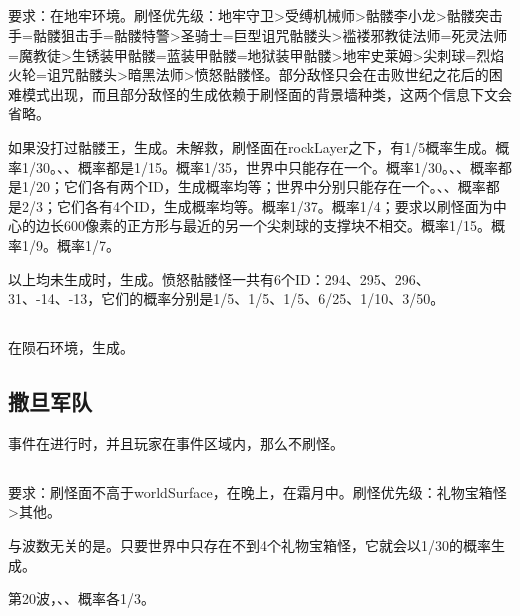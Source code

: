 \subsection{}
要求：在地牢环境。刷怪优先级：地牢守卫>受缚机械师>骷髅李小龙>骷髅突击手=骷髅狙击手=骷髅特警>圣骑士=巨型诅咒骷髅头>褴褛邪教徒法师=死灵法师=魔教徒>生锈装甲骷髅=蓝装甲骷髅=地狱装甲骷髅>地牢史莱姆>尖刺球=烈焰火轮=诅咒骷髅头>暗黑法师>愤怒骷髅怪。部分敌怪只会在击败世纪之花后的困难模式出现，而且部分敌怪的生成依赖于刷怪面的背景墙种类，这两个信息下文会省略。

如果没打过骷髅王，生成。未解救，刷怪面在rockLayer之下，有1/5概率生成。概率1/30。、、概率都是1/15。概率1/35，世界中只能存在一个。概率1/30。、、概率都是1/20；它们各有两个ID，生成概率均等；世界中分别只能存在一个。、、概率都是2/3；它们各有4个ID，生成概率均等。概率1/37。概率1/4；要求以刷怪面为中心的边长600像素的正方形与最近的另一个尖刺球的支撑块不相交。概率1/15。概率1/9。概率1/7。

以上均未生成时，生成。愤怒骷髅怪一共有6个ID：294、295、296、31、-14、-13，它们的概率分别是1/5、1/5、1/5、6/25、1/10、3/50。

\subsection{}
在陨石环境，生成。

\subsection{撒旦军队}
事件在进行时，并且玩家在事件区域内，那么不刷怪。

\subsection{}
要求：刷怪面不高于worldSurface，在晚上，在霜月中。刷怪优先级：礼物宝箱怪>其他。

与波数无关的是。只要世界中只存在不到4个礼物宝箱怪，它就会以1/30的概率生成。

第20波，、、概率各1/3。

